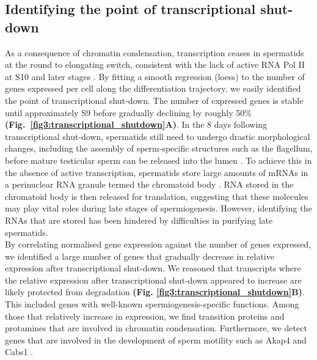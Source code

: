 \subsection{Identifying the point of transcriptional shut-down}

As a consequence of chromatin condensation, transcription ceases in spermatids at the round to elongating switch, consistent with the lack of active RNA Pol II at S10 and later stages \citep{DottermuschHeidel2014}.
By fitting a smooth regression (loess) to the number of genes expressed per cell along the differentiation trajectory, we easily identified the point of transcriptional shut-down. The number of expressed genes is stable until approximately S9 before gradually declining by roughly 50\% \textbf{(Fig.~\ref{fig3:transcriptional_shutdown}A)}. In the 8 days following transcriptional shut-down, spermatids still need to undergo drastic morphological changes, including the assembly of sperm-specific structures such as the flagellum, before mature testicular sperm can be released into the lumen \citep{ODonnell2014}. To achieve this in the absence of active transcription, spermatids store large amounts of mRNAs in a perinuclear RNA granule termed the chromatoid body \citep{Kotaja2007}. RNA stored in the chromatoid body is then released for translation, suggesting that these molecules may play vital roles during late stages of spermiogenesis. However, identifying the RNAs that are stored has been hindered by difficulties in purifying late spermatids. \\

By correlating normalised gene expression against the number of genes expressed, we identified a large number of genes that gradually decrease in relative expression after transcriptional shut-down. We reasoned that transcripts where the relative expression after transcriptional shut-down appeared to increase are likely protected from degradation \textbf{(Fig. \ref{fig3:transcriptional_shutdown}B)}. This included genes with well-known spermiogenesis-specific functions. Among those that relatively increase in expression, we find transition proteins and protamines that are involved in chromatin condensation. Furthermore, we detect genes that are involved in the development of sperm motility such as \gls{Akap4} and \gls{Cabs1} \citep{Kawashima2009, Miki2002}. 

\newpage

